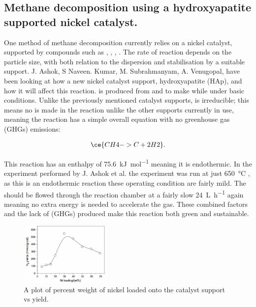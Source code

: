\subsection{Methane decomposition using a hydroxyapatite supported nickel catalyst.}%
\label{sub:methane_decomposition_using_a_hydroxyapatite_supported_nickel_catalyst_}

One method of methane decomposition currently relies on a nickel catalyst, supported by compounds such as , , , . The rate of reaction depends on the  particle size, with both relation to the dispersion and stabilisation by a suitable support. \cite{Ashok}
 J. Ashok, S Naveen. Kumar, M. Subrahmanyam, A. Venugopal, have been looking at how a new nickel catalyst support, hydroxyapatite (HAp), and how it will affect this reaction.  is produced from  and  to make \ce{[Ca5(PO4)3(OH)]} while under basic conditions.\cite{Ashok}
Unlike the previously mentioned catalyst supports,  is irreducible; this means no  is made in the reaction unlike the other supports currently in use, meaning the reaction has a simple overall equation with no greenhouse gas (GHGs) emissions:

\begin{align}
	\ce{CH4 -> C +2H2}
.\end{align}

This reaction has an enthalpy of \SI{75.6}{\kilo\joule\per\mole} meaning it is endothermic. In the experiment performed by J. Ashok et al. the experiment was run at just \SI{650}{\celsius} \cite{Ashok}, as this is an endothermic reaction these operating condition are fairly mild. The  should be flowed through the reaction chamber at a fairly slow \SI{24}{\liter\per\hour} \cite{Ashok} again meaning no extra energy is needed to accelerate the gas. These combined factors and the lack of (GHGs) produced make this reaction both green and sustainable.

\begin{figure}[H]
	\centering
	\includegraphics[width=0.4\textwidth]{539a7840-2cb8-11eb-895f-8c8590753a48.png}
	\caption{A plot of percent weight of nickel loaded onto the catalyst support vs  yield.}  
	\label{fig:MD_plots}
\end{figure}

